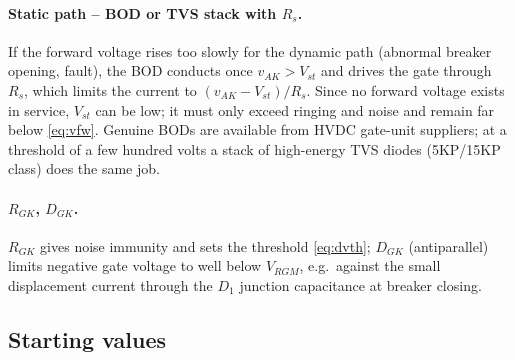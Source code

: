 \documentclass[11pt,a4paper]{article}
\begin{document}
\paragraph{Static path -- BOD or TVS stack with $R_s$.} If the forward voltage rises too slowly for
the dynamic path (abnormal breaker opening, fault), the BOD conducts once
$v_{AK} > V_{st}$ and drives the gate through $R_s$, which limits the current to
$(v_{AK} - V_{st})/R_s$. Since no forward voltage exists in service, $V_{st}$ can be low; it must
only exceed ringing and noise and remain far below \eqref{eq:vfw}. Genuine BODs are available from
HVDC gate-unit suppliers; at a threshold of a few hundred volts a stack of high-energy TVS diodes
(5KP/15KP class) does the same job.

\paragraph{$R_{GK}$, $D_{GK}$.} $R_{GK}$ gives noise immunity and sets the threshold
\eqref{eq:dvth}; $D_{GK}$ (antiparallel) limits negative gate voltage to well below $V_{RGM}$,
e.g.\ against the small displacement current through the $D_1$ junction capacitance at breaker
closing.

\subsection{Starting values}
\end{document}
